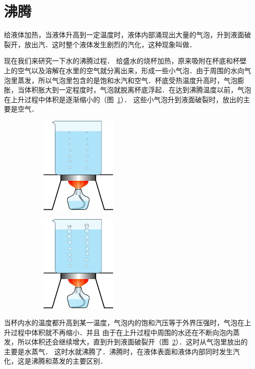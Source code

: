\section{沸腾}
给液体加热，当液体升高到一定温度时，液体内部涌现出大量的气泡，升到液面破裂开，放出汽．这时整个液体发生剧烈的汽化，这种现象叫做．

现在我们来研究一下水的沸腾过程．
给盛水的烧杯加热，原来吸附在杯底和杯壁上的空气以及溶解在水里的空气就分离出来，形成一些小气泡．由于周围的水向气泡里蒸发，所以气泡里包含的是饱和水汽和空气．杯底受热温度升高时，气泡膨胀，当体积胀大到一定程度时，气泡就脱离杯底浮起．在达到沸腾温度以前，气泡在上升过程中体积是逐渐缩小的（图~\ref{fig_B_5-6a}）．
这些小气泡升到液面破裂时，放出的主要是空气．
\begin{figure}[htbp]
    \centering
    \begin{subfigure}{0.4\linewidth}
        \centering
        \includegraphics{fig/B/5-6a.pdf}
        \caption{}\label{fig_B_5-6a}
    \end{subfigure}
    \hfil
    \begin{subfigure}{0.4\linewidth}
        \centering
        \includegraphics{fig/B/5-6b.pdf}
        \caption{}\label{fig_B_5-6b}
    \end{subfigure}
    \caption{}\label{fig_B_5-6}
\end{figure}

当杯内水的温度都升高到某一温度，气泡内的饱和汽压等于外界压强时，气泡在上升过程中体积就不再缩小．并且
由于在上升过程中周围的水还在不断向泡内蒸发，所以体积还会继续增大，直到升到液面破裂开（图~\ref{fig_B_5-6b}）．这时从气泡里放出的主要是水蒸气．
这时水就沸腾了．沸腾时，在液体表面和液体内部同时发生汽化，这是沸腾和蒸发的主要区别．

